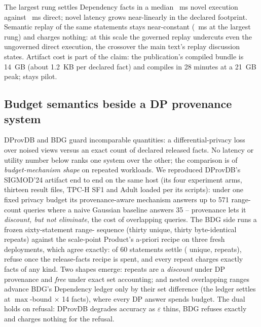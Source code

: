 \documentclass[journal,onecolumn]{IEEEtran}
\newcommand{\code}[1]{\texttt{\detokenize{#1}}}
\begin{document}
The largest rung settles \FinalVFiveScaleSevenLargestDependency{}
Dependency facts in a median \FinalVFiveScaleSevenLargestNovelMS{}~ms
novel execution against \FinalVFiveScaleSevenLargestDirectMS{}~ms
direct; novel latency grows near-linearly in the declared footprint.
Semantic replay of the same statements stays near-constant
(\FinalVFiveScaleSevenLargestReplayMS{}~ms at the largest rung) and
charges nothing: at this scale the governed replay undercuts even the
ungoverned direct execution, the crossover the main text's replay
discussion states. Artifact cost is part of the claim: the publication's
compiled bundle is 14~GB (about 1.2~KB per declared fact) and compiles
in 28 minutes at a 21~GB peak; \code{campaign\_class} stays pilot.

\subsection{Budget semantics beside a DP provenance system}
\label{sec:compare7-supp}

DProvDB \cite{zhang2023dprovdb} and BDG guard incomparable quantities: a
differential-privacy loss over noised views versus an exact count of
declared released facts. No latency or utility number below ranks one
system over the other; the comparison is of \emph{budget-mechanism
shape} on repeated workloads. We reproduced DProvDB's SIGMOD'24 artifact
end to end on the same host (its four experiment arms, thirteen result
files, TPC-H SF1 and Adult loaded per its scripts): under one fixed
privacy budget its provenance-aware mechanism answers up to 571
range-count queries where a naive Gaussian baseline answers 35 --
provenance lets it \emph{discount, but not eliminate}, the cost of
overlapping queries. The BDG side runs a frozen sixty-statement
range-\code{SUM} sequence (thirty unique, thirty byte-identical repeats)
against the scale-point Product's a-priori recipe on three fresh
deployments, which agree exactly: \FinalVFiveCompareAccepted{} of 60
statements settle (\FinalVFiveCompareUniqueAccepted{} unique,
\FinalVFiveCompareRepeatsAccepted{} repeats),
\FinalVFiveCompareBudgetRefusals{} refuse once the release-facts recipe
is spent, and every repeat charges exactly
\FinalVFiveCompareRepeatCharges{} facts of any kind. Two shapes emerge:
repeats are a \emph{discount} under DP provenance and \emph{free} under
exact set accounting; and nested overlapping ranges advance BDG's
Dependency ledger only by their set difference (the ledger settles at
$\max$-bound $\times$ 14 facts), where every DP answer spends budget.
The dual holds on refusal: DProvDB degrades accuracy as
$\varepsilon$ thins, BDG refuses exactly and charges nothing for the
refusal.
\end{document}

